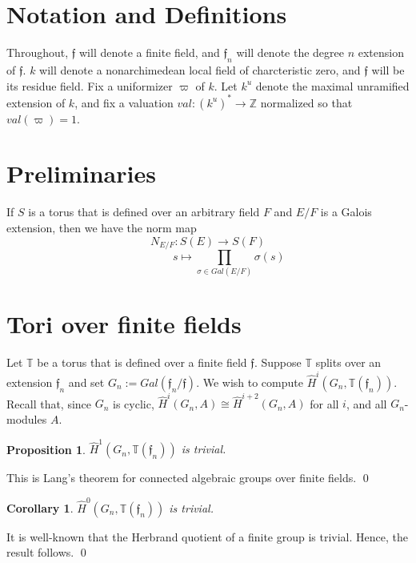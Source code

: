 \documentclass[11pt]{amsart}
\theoremstyle{plain}
\newtheorem{corollary}[enumi]{Corollary}
\newtheorem{proposition}[enumi]{Proposition}
\begin{document}
\section{Notation and Definitions}

Throughout, $\mathfrak{f}$ will denote a finite field, and $\mathfrak{f}_n$ will denote the degree $n$ extension of $\mathfrak{f}$.  $k$ will denote a nonarchimedean local field of charcteristic zero, and $\mathfrak{f}$ will be its residue field.  Fix a uniformizer $\varpi$ of $k$.  Let $k^u$ denote the maximal unramified extension of $k$, and fix a valuation $val : (k^u)^* \rightarrow \mathbb{Z}$ normalized so that $val(\varpi) = 1$.

\section{Preliminaries}

If $S$ is a torus that is defined over an arbitrary field $F$ and $E/F$ is a Galois extension, then we have the norm map $$N_{E/F} : S(E) \rightarrow S(F)$$ $$\ \ \ \ \ \ \ \ \ \ \ \ \ \ \ \ \ s \mapsto \prod_{\sigma \in Gal(E/F)} \sigma(s)$$

\section{Tori over finite fields}

Let $\mathbb{T}$ be a torus that is defined over a finite field $\mathfrak{f}$.  Suppose $\mathbb{T}$ splits over an extension $\mathfrak{f}_n$ and set $G_n := Gal(\mathfrak{f}_n/\mathfrak{f})$.  We wish to compute
$\hat{H}^i(G_n,\mathbb{T}(\mathfrak{f}_n))$.  Recall that, since $G_n$ is cyclic, $\hat{H}^{i}(G_n,A)\cong \hat{H}^{i+2}(G_n,A)$ for all $i$, and all $G_n$-modules $A$.

\begin{proposition}\label{trivialH1finitefields}
$\hat{H}^1(G_n,\mathbb{T}(\mathfrak{f}_n))$ is trivial.
\end{proposition}

\proof
This is Lang's theorem for connected algebraic groups over finite fields.
\qed

\begin{corollary}
$\hat{H}^0(G_n,\mathbb{T}(\mathfrak{f}_n))$ is trivial.
\end{corollary}

\proof
It is well-known that the Herbrand quotient of a finite group is trivial.  Hence, the result follows.
\qed
\end{document}
